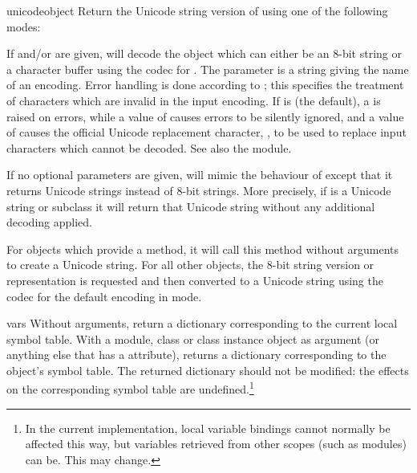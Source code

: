 \begin{funcdesc}{unicode}{object}
  Return the Unicode string version of  using one of the
  following modes:

  If  and/or  are given, 
  will decode the object which can either be an 8-bit string or a
  character buffer using the codec for . The
   parameter is a string giving the name of an encoding.
  Error handling is done according to ; this specifies the
  treatment of characters which are invalid in the input encoding.  If
   is  (the default), a
   is raised on errors, while a value of
   causes errors to be silently ignored, and a value of
   causes the official Unicode replacement character,
  , to be used to replace input characters which cannot
  be decoded.  See also the  module.

  If no optional parameters are given,  will mimic the
  behaviour of  except that it returns Unicode strings
  instead of 8-bit strings. More precisely, if  is a
  Unicode string or subclass it will return that Unicode string without
  any additional decoding applied.

  For objects which provide a  method, it will
  call this method without arguments to create a Unicode string. For
  all other objects, the 8-bit string version or representation is
  requested and then converted to a Unicode string using the codec for
  the default encoding in  mode.

\end{funcdesc}

\begin{funcdesc}{vars}{}
  Without arguments, return a dictionary corresponding to the current
  local symbol table.  With a module, class or class instance object
  as argument (or anything else that has a 
  attribute), returns a dictionary corresponding to the object's
  symbol table.  The returned dictionary should not be modified: the
  effects on the corresponding symbol table are undefined.\footnote{
    In the current implementation, local variable bindings cannot
    normally be affected this way, but variables retrieved from
    other scopes (such as modules) can be.  This may change.}
\end{funcdesc}

